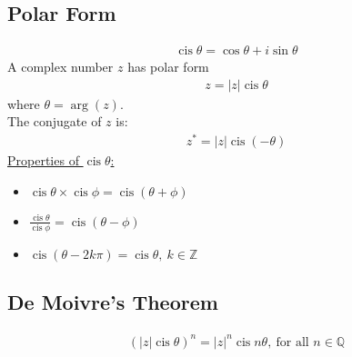 \documentclass[10pt, a4paper, titlepage]{article}
\DeclareMathOperator\cis{cis}
\begin{document}
\begin{multicols*}{3}
	\subsection{Polar Form}
	\begin{align}
		\cis{\theta}=\cos{\theta}+i\sin{\theta}
	\end{align}
	A complex number $z$ has polar form
	\begin{align}
		z=|z|\cis{\theta}
	\end{align}
	where $\theta = \arg({z})$.\\
	The conjugate of $z$ is:
	\begin{align}
		z^*=|z|\cis{(-\theta)}
	\end{align}
	\underline{Properties of $\cis{\theta}$:}
	\begin{itemize}
		\item $\cis{\theta}\times \cis{\phi}=\cis{(\theta +\phi )}$
		\item $\frac{\cis{\theta}}{\cis{\phi}}=\cis{(\theta -\phi )}$
		\item $\cis{(\theta -2k\pi )}=\cis{\theta},\ k\in \mathbb{Z}$
	\end{itemize}


	\dotfill
	\subsection{De Moivre's Theorem}
	\begin{align}
		(|z|\cis{\theta})^n=|z|^n\cis{n\theta},\ \text{for all }n\in \mathbb{Q}
	\end{align}
	\dotfill

\end{multicols*}
\end{document}
